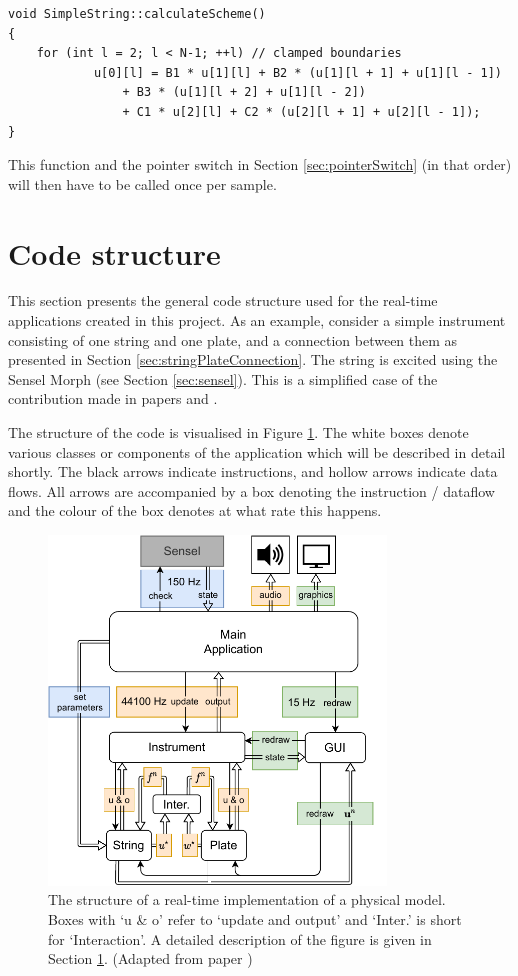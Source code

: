 \begin{lstlisting}[belowskip=-0.5\baselineskip]
void SimpleString::calculateScheme()
{
    for (int l = 2; l < N-1; ++l) // clamped boundaries
            u[0][l] = B1 * u[1][l] + B2 * (u[1][l + 1] + u[1][l - 1]) 
                + B3 * (u[1][l + 2] + u[1][l - 2])         
                + C1 * u[2][l] + C2 * (u[2][l + 1] + u[2][l - 1]);
}
\end{lstlisting}
This function and the pointer switch in Section \ref{sec:pointerSwitch} (in that order) will then have to be called once per sample.


\section{Code structure}\label{sec:codeStructure}
This section presents the general code structure used for the real-time applications created in this project. As an example, consider a simple instrument consisting of one string and one plate, and a connection between them as presented in Section \ref{sec:stringPlateConnection}. The string is excited using the Sensel Morph (see Section \ref{sec:sensel}). This is a simplified case of the contribution made in papers \citeP[A] and \citeP[B]. 

The structure of the code is visualised in Figure \ref{fig:codeStructure}. The white boxes denote various classes or components of the application which will be described in detail shortly. The black arrows indicate instructions, and hollow arrows indicate data flows. All arrows are accompanied by a box denoting the instruction / dataflow and the colour of the box denotes at what rate this happens.

\begin{figure}[h]
    \centering
    \includegraphics[width=0.8\textwidth]{figures/realtime/flowchart.pdf}
    \caption{The structure of a real-time implementation of a physical model. Boxes with `u \& o' refer to `update and output' and `Inter.' is short for `Interaction'. A detailed description of the figure is given in Section \ref{sec:codeStructure}. (Adapted from paper \citeP[A])\label{fig:codeStructure}}
\end{figure}

